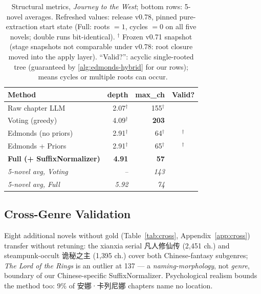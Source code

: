 \documentclass[11pt]{article}
\newenvironment{CJK}[2]{}{}
\newcommand{\cmark}{\ding{51}}
\newcommand{\xmark}{\ding{55}}
\begin{document}
\begin{table}[h]
\centering
\scriptsize
\setlength{\tabcolsep}{3pt}
\begin{tabular}{lrrc}
\toprule
\textbf{Method} & \textbf{depth} & \textbf{max\_ch} & \textbf{Valid?} \\
\midrule
Raw chapter LLM & 2.07$^\dagger$ & 155$^\dagger$ & \xmark \\
Voting (greedy) & 4.09$^\dagger$ & \textbf{203} & \xmark \\
Edmonds (no priors) & 2.91$^\dagger$ & 64$^\dagger$ & \cmark$^\dagger$ \\
Edmonds + Priors & 2.91$^\dagger$ & 65$^\dagger$ & \cmark$^\dagger$ \\
\textbf{Full (+ SuffixNormalizer)} & \textbf{4.91} & \textbf{57} & \cmark \\
\midrule
\textit{5-novel avg, Voting} & \textit{--} & \textit{143} & \xmark \\
\textit{5-novel avg, Full} & \textit{5.92} & \textit{74} & \cmark \\
\bottomrule
\end{tabular}
\caption{Structural metrics, \textit{Journey to the West}; bottom rows: 5-novel averages. Refreshed values: release v0.78, pinned pure-extraction start state (Full: roots $=1$, cycles $=0$ on all five novels; double runs bit-identical). $^\dagger$ Frozen v0.71 snapshot (stage snapshots not comparable under v0.78: root closure moved into the apply layer). ``Valid?'': acyclic single-rooted tree (guaranteed by \autoref{alg:edmonds-hybrid} for our rows); \xmark\ means cycles or multiple roots can occur.}
\label{tab:ablation}
\end{table}

\subsection{Cross-Genre Validation}
\label{sec:cross-genre}

Eight additional novels without gold (Table~\ref{tab:cross}, Appendix~\ref{app:cross}) transfer without retuning: the xianxia serial \begin{CJK}{UTF8}{gbsn}凡人修仙传\end{CJK} (2{,}451 ch.) and steampunk-occult \begin{CJK}{UTF8}{gbsn}诡秘之主\end{CJK} (1{,}395 ch.) cover both Chinese-fantasy subgenres; \textit{The Lord of the Rings} is an outlier at 137 --- a \textit{naming-morphology}, not \textit{genre}, boundary of our Chinese-specific SuffixNormalizer. Psychological realism bounds the method too: 9\% of \begin{CJK}{UTF8}{gbsn}安娜·卡列尼娜\end{CJK} chapters name no location.
\end{document}
